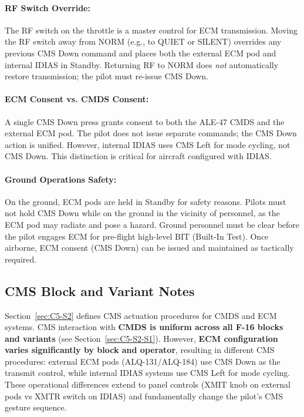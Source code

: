 \documentclass[11pt,a4paper]{article}
\begin{document}
\paragraph*{RF Switch Override:}
The RF switch on the throttle is a master control for ECM transmission. Moving the RF switch away from NORM (e.g., to QUIET or SILENT) overrides any previous CMS Down command and places both the external ECM pod and internal IDIAS in Standby. Returning RF to NORM does \textit{not} automatically restore transmission; the pilot must re-issue CMS Down.

\paragraph*{ECM Consent vs. CMDS Consent:}
A single CMS Down press grants consent to both the ALE-47 CMDS and the external ECM pod. The pilot does not issue separate commands; the CMS Down action is unified. However, internal IDIAS uses CMS Left for mode cycling, not CMS Down. This distinction is critical for aircraft configured with IDIAS.

\paragraph*{Ground Operations Safety:}
On the ground, ECM pods are held in Standby for safety reasons. Pilots must not hold CMS Down while on the ground in the vicinity of personnel, as the ECM pod may radiate and pose a hazard. Ground personnel must be clear before the pilot engages ECM for pre-flight high-level BIT (Built-In Test). Once airborne, ECM consent (CMS Down) can be issued and maintained as tactically required.

\subsection{CMS Block and Variant Notes}\label{sec:C5-S3}

Section~\ref{sec:C5-S2} defines CMS actuation procedures for CMDS and ECM systems. 
CMS interaction with \textbf{CMDS is uniform across all F-16 blocks and variants} (see Section~\ref{sec:C5-S2-S1}). However, \textbf{ECM configuration varies significantly by block and operator}, resulting in different CMS procedures: external ECM pods (ALQ-131/ALQ-184) use CMS Down as the transmit control, while internal IDIAS systems use CMS Left for mode cycling. These operational differences extend to panel controls (XMIT knob on external pods vs XMTR switch on IDIAS) and fundamentally change the pilot's CMS gesture sequence.
\end{document}
